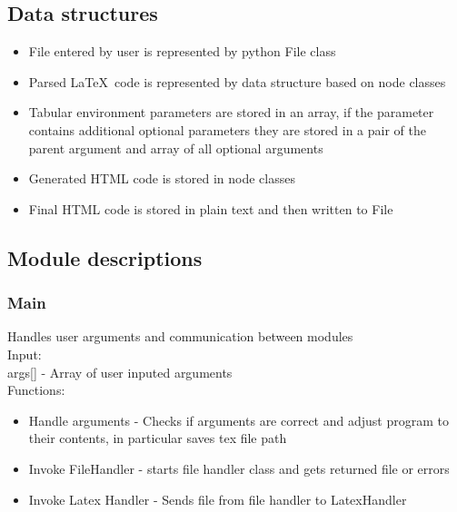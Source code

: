 \documentclass[12pt]{article}
\begin{document}
\subsection{Data structures}
\begin{itemize}
\item File entered by user is represented by python File class 
\item Parsed \LaTeX \, code is represented by data structure based on node classes 
\item Tabular environment parameters are stored in an array, if the parameter contains additional optional parameters they are stored in a pair of the parent argument and array of all optional arguments 
\item Generated HTML code is stored in node classes 
\item Final HTML code is stored in plain text and then written to File
\end{itemize}

\subsection{Module descriptions}
\subsubsection{Main}
Handles user arguments and communication between modules \\ 
Input: \\ 
args[] - Array of user inputed arguments \\ 
Functions: 
\begin{itemize}
    \item Handle arguments - Checks if arguments are correct and adjust program to their contents, in particular saves tex file path
    \item Invoke FileHandler - starts file handler class and gets returned file or errors 
    \item Invoke Latex Handler - Sends file from file handler to LatexHandler 
\end{itemize}
\end{document}
